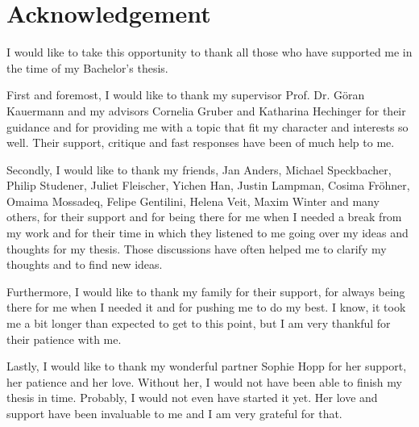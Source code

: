 \documentclass[12pt]{article}
\begin{document}
\section*{Acknowledgement}
I would like to take this opportunity to thank all those who have supported me
in the time of my Bachelor's thesis.\bigskip

First and foremost, I would like to thank my supervisor Prof. Dr. Göran Kauermann
and my advisors Cornelia Gruber and Katharina Hechinger for their guidance and
for providing me with a topic that fit my character and interests so well. Their
support, critique and fast responses have been of much help to me.\bigskip

Secondly, I would like to thank my friends, Jan Anders, Michael Speckbacher,
Philip Studener, Juliet Fleischer, Yichen Han, Justin Lampman, Cosima Fröhner,
Omaima Mossadeq, Felipe Gentilini, Helena Veit, Maxim Winter and many others,
for their support and for being there for me when I needed a break from my work
and for their time in which they listened to me going over my ideas and thoughts
for my thesis. Those discussions have often helped me to clarify my thoughts and
to find new ideas.\bigskip

Furthermore, I would like to thank my family for their support, for always
being there for me when I needed it and for pushing me to do my best. I know, 
it took me a bit longer than expected to get to this point, but I am very
thankful for their patience with me.\bigskip

Lastly, I would like to thank my wonderful partner Sophie Hopp for her support,
her patience and her love. Without her, I would not have been able to finish my
thesis in time. Probably, I would not even have started it yet. Her love and
support have been invaluable to me and I am very grateful for that.

\newpage
\tableofcontents

\newpage



\listoffigures


\newpage

\end{document}
